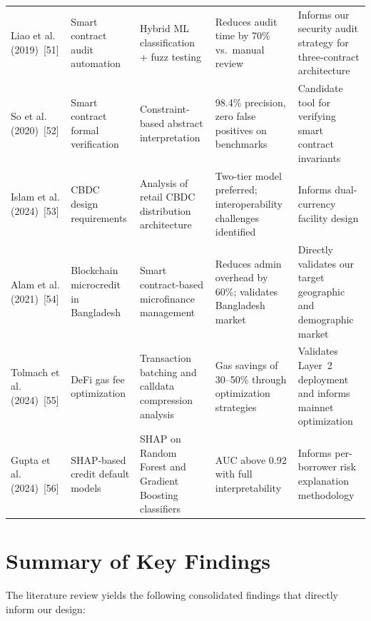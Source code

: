 \documentclass[12pt,a4paper]{report}
\begin{document}
\begin{longtable}{@{} p{2.2cm} p{2.2cm} p{2.5cm} p{2.8cm} p{2.8cm} @{}}
Liao et al. (2019)~[51] & Smart contract audit automation & Hybrid ML classification + fuzz testing & Reduces audit time by 70\% vs.\ manual review & Informs our security audit strategy for three-contract architecture \\
\rowcolor{RowShade}
So et al. (2020)~[52] & Smart contract formal verification & Constraint-based abstract interpretation & 98.4\% precision, zero false positives on benchmarks & Candidate tool for verifying smart contract invariants \\
Islam et al. (2024)~[53] & CBDC design requirements & Analysis of retail CBDC distribution architecture & Two-tier model preferred; interoperability challenges identified & Informs dual-currency facility design \\
\rowcolor{RowShade}
Alam et al. (2021)~[54] & Blockchain microcredit in Bangladesh & Smart contract-based microfinance management & Reduces admin overhead by 60\%; validates Bangladesh market & Directly validates our target geographic and demographic market \\
Tolmach et al. (2024)~[55] & DeFi gas fee optimization & Transaction batching and calldata compression analysis & Gas savings of 30--50\% through optimization strategies & Validates Layer~2 deployment and informs mainnet optimization \\
\rowcolor{RowShade}
Gupta et al. (2024)~[56] & SHAP-based credit default models & SHAP on Random Forest and Gradient Boosting classifiers & AUC above 0.92 with full interpretability & Informs per-borrower risk explanation methodology \\
\end{longtable}


\section{Summary of Key Findings}

The literature review yields the following consolidated findings that directly inform our design:
\end{document}
